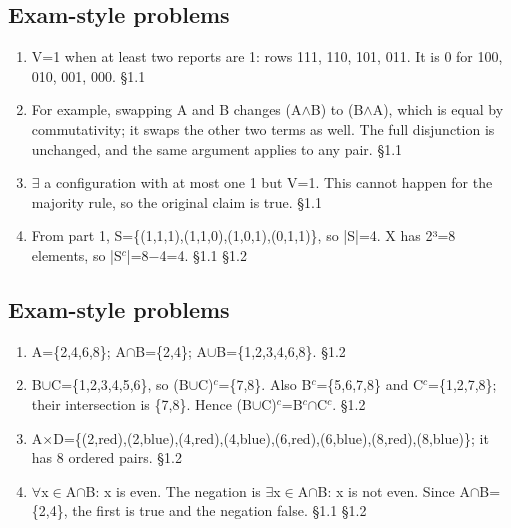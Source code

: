 \documentclass[11pt]{article}
\begin{document}
\begin{keepsection}\subsection{Exam-style problems}

\begin{enumerate}
\item V=1 when at least two reports are 1: rows 111, 110, 101, 011. It is 0 for 100, 010, 001, 000. \hfill{\small\color{FAUblue}§1.1}
\item For example, swapping A and B changes (A\ensuremath{\land}B) to (B\ensuremath{\land}A), which is equal by commutativity; it swaps the other two terms as well. The full disjunction is unchanged, and the same argument applies to any pair. \hfill{\small\color{FAUblue}§1.1}
\item \ensuremath{\exists} a configuration with at most one 1 but V=1. This cannot happen for the majority rule, so the original claim is true. \hfill{\small\color{FAUblue}§1.1}
\item From part 1, S=\{(1,1,1),(1,1,0),(1,0,1),(0,1,1)\}, so |S|=4. X has 2³=8 elements, so |S\ensuremath{^{c}}|=8\ensuremath{-}4=4. \hfill{\small\color{FAUblue}§1.1} \hfill{\small\color{FAUblue}§1.2}
\end{enumerate}

\end{keepsection}
\begin{keepsection}\subsection{Exam-style problems}

\begin{enumerate}
\item A=\{2,4,6,8\}; A\ensuremath{\cap}B=\{2,4\}; A\ensuremath{\cup}B=\{1,2,3,4,6,8\}. \hfill{\small\color{FAUblue}§1.2}
\item B\ensuremath{\cup}C=\{1,2,3,4,5,6\}, so (B\ensuremath{\cup}C)\ensuremath{^{c}}=\{7,8\}. Also B\ensuremath{^{c}}=\{5,6,7,8\} and C\ensuremath{^{c}}=\{1,2,7,8\}; their intersection is \{7,8\}. Hence (B\ensuremath{\cup}C)\ensuremath{^{c}}=B\ensuremath{^{c}}\ensuremath{\cap}C\ensuremath{^{c}}. \hfill{\small\color{FAUblue}§1.2}
\item A\ensuremath{\times}D=\{(2,red),(2,blue),(4,red),(4,blue),(6,red),(6,blue),(8,red),(8,blue)\}; it has 8 ordered pairs. \hfill{\small\color{FAUblue}§1.2}
\item \ensuremath{\forall}x\ensuremath{\in}A\ensuremath{\cap}B: x is even. The negation is \ensuremath{\exists}x\ensuremath{\in}A\ensuremath{\cap}B: x is not even. Since A\ensuremath{\cap}B=\{2,4\}, the first is true and the negation false. \hfill{\small\color{FAUblue}§1.1} \hfill{\small\color{FAUblue}§1.2}
\end{enumerate}

\end{keepsection}
\end{document}
